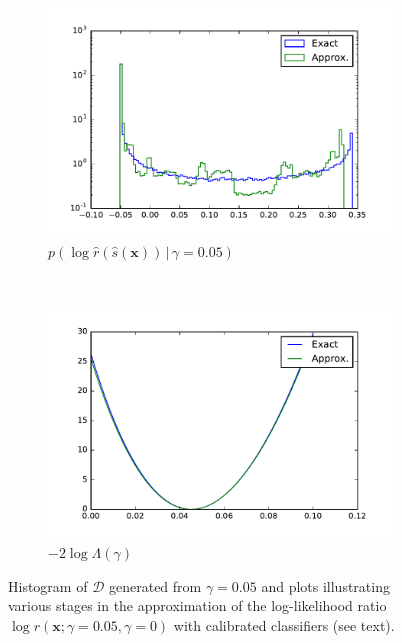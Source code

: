 \documentclass[12pt]{article}
\numberwithin{equation}{section}
\theoremstyle{plain}
\begin{document}
\begin{figure}
    \begin{subfigure}[b]{0.4\textwidth}
        \includegraphics[clip, trim=0.5cm 0.5cm 0.5cm 0.5cm,width=\textwidth]{figures/fig1e.pdf}
        \caption{$p( \log \hat r(\hat{s}(\mathbf{x})) \, | \,\gamma = 0.05)$ }
        \label{fig:decomposed_ratio}
    \end{subfigure}
    ~
    \begin{subfigure}[b]{0.4\textwidth}
        \includegraphics[clip, trim=0.5cm 0.5cm 0.5cm 0.5cm,width=\textwidth]{figures/fig1f.pdf}
        \caption{$-2\log \Lambda(\gamma)$ }
        \label{fig:likelihood}
    \end{subfigure}

    \caption{Histogram of $\mathcal{D}$ generated from $\gamma=0.05$ and plots illustrating various stages in 
    the approximation of the log-likelihood ratio  $\log r(\mathbf{x};\gamma=0.05,\gamma=0)$
             with calibrated classifiers (see text). }
\end{figure}
\end{document}
